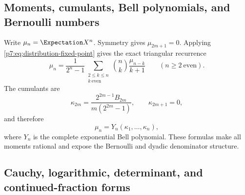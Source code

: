 \documentclass[11pt]{article}
\theoremstyle{definition}
\theoremstyle{remark}
\begin{document}
\subsection{Moments, cumulants, Bell polynomials, and Bernoulli numbers}

Write \(\mu_n=\Expectation X^n\). Symmetry gives \(\mu_{2m+1}=0\). Applying
\eqref{p7:eq:distribution-fixed-point} gives the exact triangular recurrence
\begin{equation}
 \mu_n=\frac{1}{2^n-1}
 \sum_{\substack{2\le k\le n\\k\ \mathrm{even}}}
 \binom{n}{k}\frac{\mu_{n-k}}{k+1}
 \qquad(n\ge2\ \mathrm{even}).
 \label{p7:eq:moment-recurrence}
\end{equation}
The cumulants are
\begin{equation}
 \kappa_{2m}=\frac{2^{2m-1}B_{2m}}{m(2^{2m}-1)},
 \qquad \kappa_{2m+1}=0,
 \label{p7:eq:cumulants}
\end{equation}
and therefore
\begin{equation}
 \mu_n=Y_n(\kappa_1,\ldots,\kappa_n),
 \label{p7:eq:Bell-moments}
\end{equation}
where \(Y_n\) is the complete exponential Bell polynomial. These formulas make all moments
rational and expose the Bernoulli and dyadic denominator structure.

\subsection{Cauchy, logarithmic, determinant, and continued-fraction forms}
\end{document}
